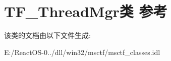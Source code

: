 \hypertarget{class_t_f___thread_mgr}{}\section{T\+F\+\_\+\+Thread\+Mgr类 参考}
\label{class_t_f___thread_mgr}


该类的文档由以下文件生成\+:\begin{DoxyCompactItemize}
\item 
E\+:/\+React\+O\+S-\/0../dll/win32/msctf/msctf\+\_\+classes.\+idl\end{DoxyCompactItemize}
